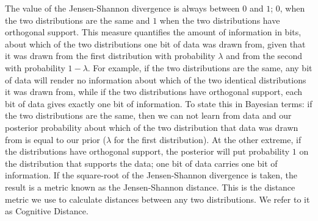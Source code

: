 The value of the Jensen-Shannon divergence is always between $0$ and $1$; $0$, when the two distributions are the same and $1$ when the two distributions have orthogonal support. This measure quantifies the amount of information in bits, about which of the two distributions one bit of data was drawn from, given that it was drawn from the first distribution with probability $\lambda$ and from the second with probability $1-\lambda$. For example, if the two distributions are the same, any bit of data will render no information about which of the two identical distributions it was drawn from, while if the two distributions have orthogonal support, each bit of data gives exactly one bit of information. To state this in Bayesian terms: if the two distributions are the same, then we can not learn from data and our posterior probability about which of the two distribution that data was drawn from is equal to our prior ($\lambda$ for the first distribution). At the other extreme, if the distributions have orthogonal support, the posterior will put probability $1$ on the distribution that supports the data; one bit of data carries one bit of information. If the square-root of the Jensen-Shannon divergence is taken, the result is a metric known as the Jensen-Shannon distance. This is the distance metric we use to calculate distances between any two distributions.  We refer to it as Cognitive Distance. 
